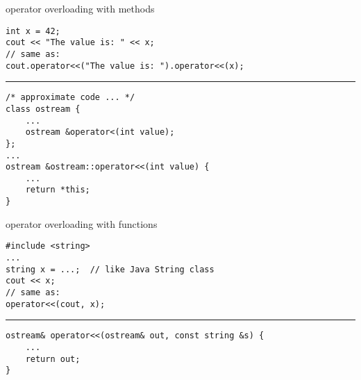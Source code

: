 \begin{frame}[fragile,label=implMeth]{operator overloading with methods}
\lstset{language=C++,style=smaller}
\begin{lstlisting}
int x = 42;
cout << "The value is: " << x;
// same as:
cout.operator<<("The value is: ").operator<<(x);
\end{lstlisting}
\hrule
\begin{lstlisting}
/* approximate code ... */
class ostream {
    ...
    ostream &operator<(int value);
};
...
ostream &ostream::operator<<(int value) {
    ...
    return *this;
}
\end{lstlisting}
\end{frame}

\begin{frame}[fragile,label=implMeth]{operator overloading with functions}
\lstset{language=C++,style=smaller}
\begin{lstlisting}
#include <string>
...
string x = ...;  // like Java String class
cout << x;
// same as:
operator<<(cout, x);
\end{lstlisting}
\hrule
\begin{lstlisting}
ostream& operator<<(ostream& out, const string &s) {
    ...
    return out;
}
\end{lstlisting}
\end{frame}

